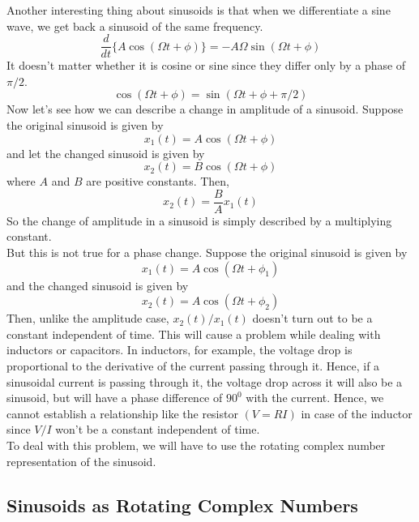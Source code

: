 Another interesting thing about sinusoids is that when we differentiate a
sine wave, we get back a sinusoid of the same frequency.
\begin{equation*}
\frac{d}{d t}  \{ A \cos (\Omega t + \phi) \} = - A \Omega \sin
   (\Omega t + \phi)
\end{equation*}
It doesn't matter whether it is cosine or sine since they differ only by a
phase of $\pi / 2$.
\[ \cos (\Omega t + \phi) = \sin (\Omega t + \phi + \pi / 2) \]
Now let's see how we can describe a change in amplitude of a sinusoid.
Suppose the original sinusoid is given by
\[ x_1 (t) = A \cos (\Omega t + \phi) \]
and let the changed sinusoid is given by
\[ x_2 (t) = B \cos (\Omega t + \phi) \]
where $A$ and $B$ are positive constants. Then,
\[ x_2 (t) = \frac{B}{A} x_1 (t) \]
So the change of amplitude in a sinusoid is simply described by a multiplying
constant.\\
But this is not true for a phase change. Suppose the original sinusoid is
given by
\[ x_1 (t) = A \cos (\Omega t + \phi_1) \]
and the changed sinusoid is given by
\[ x_2 (t) = A \cos (\Omega t + \phi_2) \]
Then, unlike the amplitude case, $x_2 (t) / x_1 (t)$ doesn't turn out to be a
constant independent of time. This will cause a problem while dealing with
inductors or capacitors. In inductors, for example, the voltage drop is
proportional to the derivative of the current passing through it. Hence, if a
sinusoidal current is passing through it, the voltage drop across it will also
be a sinusoid, but will have a phase difference of $90^0$ with the current.
Hence, we cannot establish a relationship like the resistor $(V = RI)$ in case
of the inductor since $V / I$ won't be a constant independent of time.\\
To deal with this problem, we will have to use the rotating complex number
representation of the sinusoid.

\subsection{Sinusoids as Rotating Complex Numbers}

